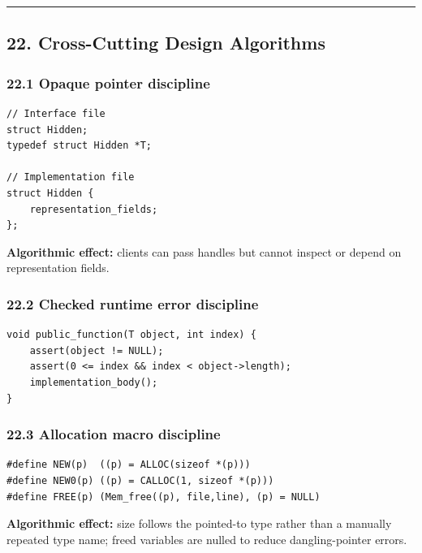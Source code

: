 \documentclass[11pt]{article}
\begin{document}
\begin{center}\rule{0.5\linewidth}{0.5pt}\end{center}

\subsection{22. Cross-Cutting Design Algorithms}\label{cross-cutting-design-algorithms}

\subsubsection{22.1 Opaque pointer discipline}\label{opaque-pointer-discipline}

\begin{verbatim}
// Interface file
struct Hidden;
typedef struct Hidden *T;

// Implementation file
struct Hidden {
    representation_fields;
};
\end{verbatim}

\textbf{Algorithmic effect:} clients can pass handles but cannot inspect or depend on representation fields.

\subsubsection{22.2 Checked runtime error discipline}\label{checked-runtime-error-discipline}

\begin{verbatim}
void public_function(T object, int index) {
    assert(object != NULL);
    assert(0 <= index && index < object->length);
    implementation_body();
}
\end{verbatim}

\subsubsection{22.3 Allocation macro discipline}\label{allocation-macro-discipline}

\begin{verbatim}
#define NEW(p)  ((p) = ALLOC(sizeof *(p)))
#define NEW0(p) ((p) = CALLOC(1, sizeof *(p)))
#define FREE(p) (Mem_free((p), file,line), (p) = NULL)
\end{verbatim}

\textbf{Algorithmic effect:} size follows the pointed-to type rather than a manually repeated type name; freed variables are nulled to reduce dangling-pointer errors.
\end{document}
